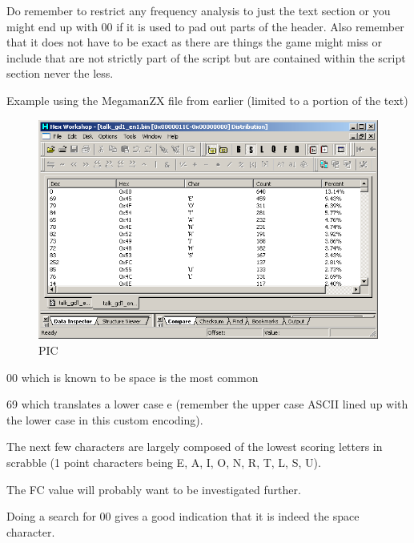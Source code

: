 \documentclass[
]{book}
\begin{document}
Do remember to restrict any frequency analysis to just the text section or you might end up with 00 if it is used to pad out parts of the header. Also remember that it does not have to be exact as there are things the game might miss or include that are not strictly part of the script but are contained within the script section never the less.

Example using the MegamanZX file from earlier (limited to a portion of the text)

\begin{figure}
\centering
\includegraphics{images/95_home_fast6191_romhackingguide_unrenamed_file___ders_romhackingguidertextfrequencyanalysis1.png}
\caption{PIC}
\end{figure}

00 which is known to be space is the most common

69 which translates a lower case e (remember the upper case ASCII lined up with the lower case in this custom encoding).

The next few characters are largely composed of the lowest scoring letters in scrabble (1 point characters being E, A, I, O, N, R, T, L, S, U).

The FC value will probably want to be investigated further.

Doing a search for 00 gives a good indication that it is indeed the space character.
\end{document}
